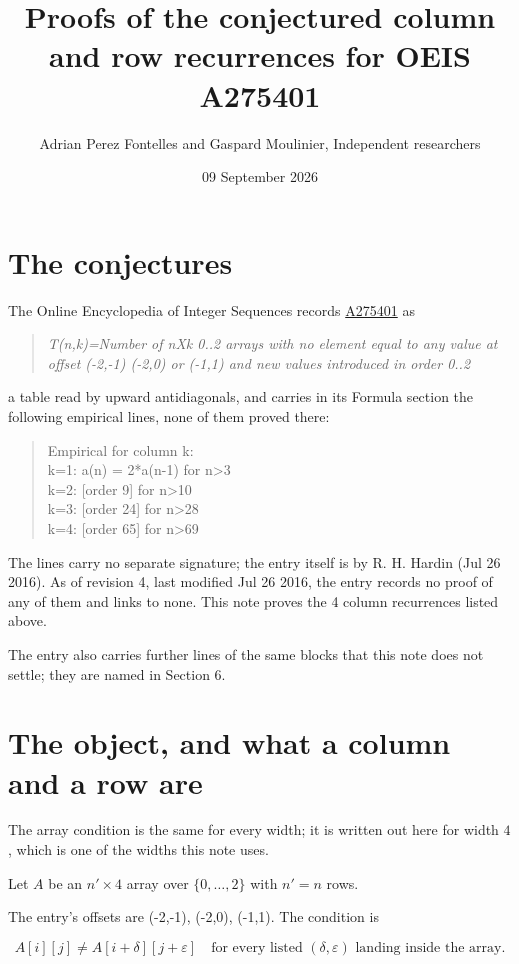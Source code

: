 \documentclass[11pt]{article}
\title{Proofs of the conjectured column and row recurrences for OEIS A275401}
\author{Adrian Perez Fontelles and Gaspard Moulinier, Independent researchers}
\date{09 September 2026}
\theoremstyle{definition}
\begin{document}
\maketitle
\section{The conjectures}

The Online Encyclopedia of Integer Sequences records \href{https://oeis.org/A275401}{A275401} as

\begin{quote}\itshape T(n,k)=Number of nXk 0..2 arrays with no element equal to any value at offset (-2,-1) (-2,0) or (-1,1) and new values introduced in order 0..2\end{quote}

a table read by upward antidiagonals, and carries in its Formula section the following empirical lines, none of them proved there:

\begin{quote}\ttfamily Empirical for column k:\\
k=1: a(n) = 2*a(n-1) for n>3\\k=2: [order 9] for n>10\\k=3: [order 24] for n>28\\k=4: [order 65] for n>69\end{quote}

The lines carry no separate signature; the entry itself is by R. H. Hardin (Jul 26 2016). As of revision 4, last modified Jul 26 2016, the entry records no proof of any of them and links to none. This note proves the 4 column recurrences listed above.

The entry also carries further lines of the same blocks that this note does not settle; they are named in Section 6.

\section{The object, and what a column and a row are}

The array condition is the same for every width; it is written out here for width $4$, which is one of the widths this note uses.

Let $A$ be an $n' \times 4$ array over $\{0,\dots,2\}$ with $n' = n$ rows.

The entry's offsets are (-2,-1), (-2,0), (-1,1). The condition is

\[A[i][j] \ne A[i{+}\delta][j{+}\varepsilon]\quad\text{for every listed }(\delta,\varepsilon)\text{ landing inside the array.}\]
\end{document}
